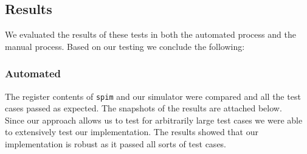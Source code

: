 \documentclass[hidelinks,12pt]{article}
\begin{document}
\subsection{Results}
We evaluated the results of these tests in both the automated process and the manual process. Based on our testing we conclude the following:
\subsubsection{Automated}
The register contents of \verb|spim| and our simulator were compared and all the test cases passed as expected. The snapshots of the results are attached below.\\

Since our approach allows us to test for arbitrarily large test cases we were able to extensively test our implementation. The results showed that our implementation is robust as it passed all sorts of test cases.
\end{document}
